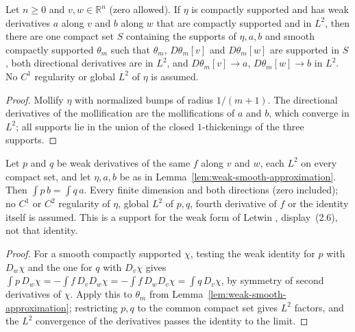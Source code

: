 \begin{lemma}
  \label{lem:weak-smooth-approximation}
  \leanok
  Let $n\ge0$ and $v,w\in\mathbb R^n$ (zero allowed). If $\eta$ is compactly supported and has weak derivatives $a$ along $v$ and $b$
  along $w$ that are compactly supported and in $L^2$, then there are one compact set $S$ containing the supports of $\eta,a,b$ and
  smooth compactly supported $\theta_m$ such that $\theta_m$, $D\theta_m[v]$ and $D\theta_m[w]$ are supported in $S$, both directional
  derivatives are in $L^2$, and $D\theta_m[v]\to a$, $D\theta_m[w]\to b$ in $L^2$. No $C^1$ regularity or global $L^2$ of $\eta$ is
  assumed.
\end{lemma}
\begin{proof}
  \leanok
  Mollify $\eta$ with normalized bumps of radius $1/(m+1)$. The directional derivatives of the mollification are the mollifications of
  $a$ and $b$, which converge in $L^2$; all supports lie in the union of the closed $1$-thickenings of the three supports.
\end{proof}

\begin{lemma}
  \label{lem:weak-curl-rough-test}
  \leanok
  Let $p$ and $q$ be weak derivatives of the same $f$ along $v$ and $w$, each $L^2$ on every compact set, and let $\eta,a,b$ be as in
  Lemma~\ref{lem:weak-smooth-approximation}. Then $\int p\,b=\int q\,a$. Every finite dimension and both directions (zero included);
  no $C^1$ or $C^2$ regularity of $\eta$, global $L^2$ of $p,q$, fourth derivative of $f$ or the identity itself is assumed. This is a
  support for the weak form of Letwin \cite{Letwin2026QuadraticKLS}, display~(2.6), not that identity.
\end{lemma}
\begin{proof}
  \leanok
  For a smooth compactly supported $\chi$, testing the weak identity for $p$ with $D_w\chi$ and the one for $q$ with $D_v\chi$ gives
  $\int p\,D_w\chi=-\int f\,D_vD_w\chi=-\int f\,D_wD_v\chi=\int q\,D_v\chi$, by symmetry of second derivatives of $\chi$. Apply this to
  $\theta_m$ from Lemma~\ref{lem:weak-smooth-approximation}; restricting $p,q$ to the common compact set gives $L^2$ factors, and the
  $L^2$ convergence of the derivatives passes the identity to the limit.
\end{proof}


